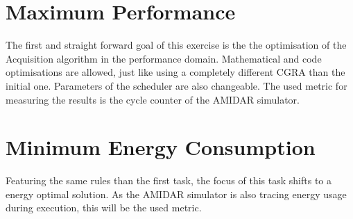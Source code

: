 	\section{Maximum Performance} %
	\label{sec:task_max_perf}
		The first and straight forward goal of this exercise is the the optimisation of the Acquisition algorithm in the performance domain. Mathematical and code optimisations are allowed, just like using a completely different CGRA than the initial one. Parameters of the scheduler are also changeable.
		The used metric for measuring the results is the cycle counter of the AMIDAR simulator.

	\section{Minimum Energy Consumption} %
	\label{sec:task_min_energy}
		Featuring the same rules than the first task, the focus of this task shifts to a energy optimal solution. As the AMIDAR simulator is also tracing energy usage during execution, this will be the used metric.
